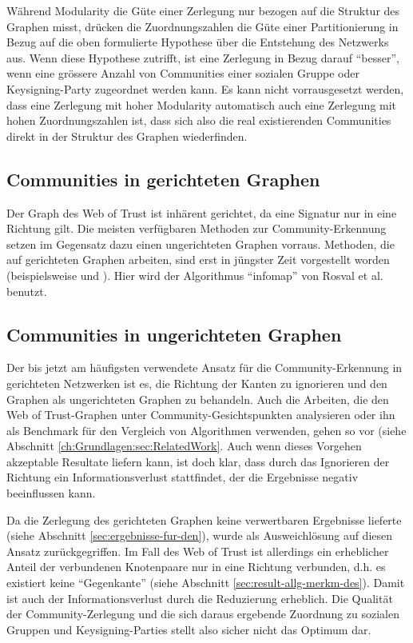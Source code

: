 W\"ahrend Modularity die G\"ute einer Zerlegung nur bezogen auf die
Struktur des Graphen misst, dr\"ucken die Zuordnungszahlen die G\"ute
einer Partitionierung in Bezug auf die oben formulierte Hypothese
\"uber die Entstehung des Netzwerks aus. Wenn diese Hypothese
zutrifft, ist eine Zerlegung in Bezug darauf ``besser'', wenn eine
gr\"ossere Anzahl von Communities einer sozialen Gruppe oder
Keysigning-Party zugeordnet werden kann. Es kann nicht vorrausgesetzt
werden, dass eine Zerlegung mit hoher Modularity automatisch auch eine
Zerlegung mit hohen Zuordnungszahlen ist, dass sich also die real
existierenden Communities direkt in der Struktur des Graphen
wiederfinden.

\subsection{Communities in gerichteten Graphen}
\label{sec:comm-gericht-graph}
Der Graph des Web of Trust ist inh\"arent gerichtet, da eine Signatur
nur in eine Richtung gilt. Die meisten verf\"ugbaren Methoden zur
Community-Erkennung setzen im Gegensatz dazu einen ungerichteten
Graphen vorraus. Methoden, die auf gerichteten Graphen arbeiten, sind
erst in j\"ungster Zeit vorgestellt worden (beispielsweise
\cite{Leicht2008} und \cite{Rosvall2008}). Hier wird der Algorithmus
``infomap'' von Rosval et al.\cite{Rosvall2008} benutzt. 

\subsection{Communities in ungerichteten Graphen}
\label{sec:comm-unger-graph}


Der bis jetzt am h\"aufigsten verwendete Ansatz f\"ur die
Community-Erkennung in gerichteten Netzwerken ist es, die Richtung der
Kanten zu ignorieren und den Graphen als ungerichteten Graphen zu
behandeln. Auch die Arbeiten, die den Web of Trust-Graphen unter
Community-Gesichtspunkten analysieren oder ihn als Benchmark f\"ur den
Vergleich von Algorithmen verwenden, gehen so vor (siehe Abschnitt
\ref{ch:Grundlagen:sec:RelatedWork}. Auch wenn dieses Vorgehen akzeptable Resultate
liefern kann, ist doch klar, dass durch das Ignorieren der Richtung
ein Informationsverlust stattfindet, der die Ergebnisse negativ
beeinflussen kann.

Da die Zerlegung des gerichteten Graphen keine verwertbaren Ergebnisse
lieferte (siehe Abschnitt \ref{sec:ergebnisse-fur-den}), wurde als
Ausweichl\"osung auf diesen Ansatz zur\"uckgegriffen.  Im Fall des Web
of Trust ist allerdings ein erheblicher Anteil der verbundenen
Knotenpaare nur in eine Richtung verbunden, d.h. es existiert keine
``Gegenkante'' (siehe Abschnitt
\ref{sec:result-allg-merkm-des}). Damit ist auch der
Informationsverlust durch die Reduzierung erheblich. Die Qualit\"at
der Community-Zerlegung und die sich daraus ergebende Zuordnung zu
sozialen Gruppen und Keysigning-Parties stellt also sicher nicht das
Optimum dar.

